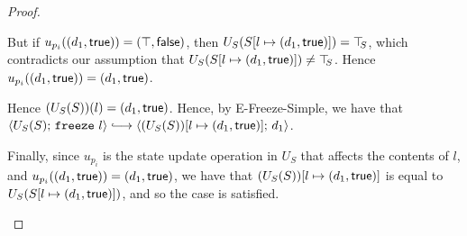 \begin{proof}
\begin{itemize}
      But if $u_{p_i}((d_1, \textsf{true})) =
      (\top, \textsf{false})$, then
      $U_S(S[l \mapsto (d_1, \textsf{true})]) = \top\hspace{-0.85mm}_{S}$, which contradicts
      our assumption that $U_S(S[l \mapsto (d_1, \textsf{true})]) \neq
      \top\hspace{-0.85mm}_{S}$.  Hence $u_{p_i}((d_1, \textsf{true})) =
      (d_1, \textsf{true})$.

      Hence $(U_S(S))(l) = (d_1, \textsf{true})$.  Hence, by {\sc
        E-Freeze-Simple}, we have that $\config{U_S(S)}{\freeze{l}}
      \parstepsto \config{\extS{(U_S(S))}{l}{d_1}{\frozentrue}}{d_1}$.

      Finally, since $u_{p_i}$ is the state update operation in $U_S$
      that affects the contents of $l$, and
      $u_{p_i}((d_1, \textsf{true})) = (d_1, \textsf{true})$,
      we have that $(U_S(S))[l \mapsto (d_1, \textsf{true})]$ is equal to
      $U_S(S[l \mapsto (d_1, \textsf{true})])$, and so the case is
      satisfied.

  \end{itemize}
\end{proof}
